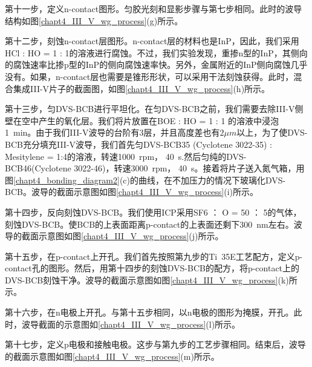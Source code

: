 第十一步，定义n-contact图形。匀胶光刻和显影步骤与第七步相同。此时的波导结构如图\ref{chapt4_III_V_wg_process}(g)所示。

第十二步，刻蚀n-contact层图形。n-contact层的材料也是InP，因此，我们采用HCl : HO = 1 : 1的溶液进行腐蚀。不过，我们实验发现，重掺n型的InP，其侧向的腐蚀速率比掺p型的InP的侧向腐蚀速率快。另外，金属附近的InP侧向腐蚀几乎没有。如果，n-contact层也需要是锥形形状，可以采用干法刻蚀获得。此时，混合集成III-V片子的截面图，如图\ref{chapt4_III_V_wg_process}(h)所示。

第十三步，匀DVS-BCB进行平坦化。在匀DVS-BCB之前，我们需要去除III-V侧壁在空中产生的氧化层。我们将片放置在BOE : HO = 1 : 1 的溶液中浸泡1~min。由于我们III-V波导的台阶有3层，并且高度差也有$2 \mu m$以上，为了使DVS-BCB充分填充III-V波导，我们首先匀DVS-BCB35 (Cyclotene 3022-35)\cite{dvsbcb35} : Mesitylene = 1:4的溶液，转速1000~rpm， 40~s.然后匀纯的DVS-BCB46(Cyclotene 3022-46)\cite{dvsbcb46}，转速3000~rpm， 40~s。接着将片子送入氮气箱，用图\ref{chapt4_bonding_diagram2}(c)的曲线，在不加压力的情况下玻璃化DVS-BCB。波导的截面示意图如图\ref{chapt4_III_V_wg_process}(i)所示。

第十四步，反向刻蚀DVS-BCB。我们使用ICP采用SF6 ： O = 50 ： 5的气体，刻蚀DVS-BCB。使BCB的上表面距离p-contact的上表面还剩下300~nm左右。波导的截面示意图如图\ref{chapt4_III_V_wg_process}(j)所示。

第十五步，在p-contact上开孔。我们首先按照第九步的Ti~35E工艺配方，定义p-contact孔的图形。然后，用第十四步的刻蚀DVS-BCB的配方，将p-contact上的DVS-BCB刻蚀干净。波导的截面示意图如图\ref{chapt4_III_V_wg_process}(k)所示。

第十六步，在n电极上开孔。与第十五步相同，以n电极的图形为掩膜，开孔。此时，波导截面的示意图如\ref{chapt4_III_V_wg_process}(l)所示。

第十七步，定义p电极和接触电极。这步与第九步的工艺步骤相同。结束后，波导的截面示意图如图\ref{chapt4_III_V_wg_process}(m)所示。

